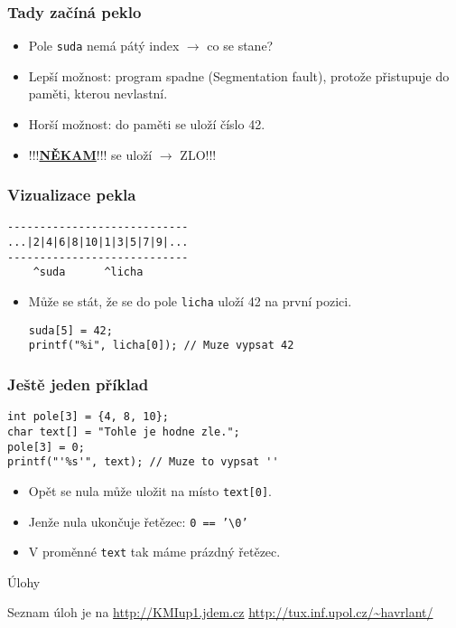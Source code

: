 \documentclass{beamer}
\newenvironment{itemizex}%
  {\large \begin{itemize}%
    \setlength{\itemsep}{8pt}%
    \setlength{\parskip}{8pt}}%
  {\end{itemize}}
\begin{document}
\begin{frame}[t,fragile]\frametitle{Tady začíná peklo} 
    \begin{itemizex}
        \begin{verbatim} 
int suda[5] = {2, 4, 6, 8, 10};
int licha[5] = {1, 3, 5, 7, 9};
suda[5] = 42;
        \end{verbatim}
        \item Pole \texttt{suda} nemá pátý index $\longrightarrow$ co se stane?
        \item Lepší možnost: program spadne (Segmentation fault), protože přistupuje do paměti, kterou nevlastní. 
        \item Horší možnost:  do paměti se uloží číslo 42.
        \item !!!\underline{\textbf{NĚKAM}}!!! se uloží $\longrightarrow$ ZLO!!!
    \end{itemizex}
\end{frame}


\begin{frame}[t,fragile]\frametitle{Vizualizace pekla} 
\begin{verbatim} 
----------------------------
...|2|4|6|8|10|1|3|5|7|9|...
----------------------------
    ^suda      ^licha
\end{verbatim}
    \begin{itemizex}
        \item Může se stát, že se do pole \texttt{licha} uloží 42 na první pozici.
        \begin{verbatim} 
suda[5] = 42;
printf("%i", licha[0]); // Muze vypsat 42
        \end{verbatim}
    \end{itemizex}
\end{frame}


\begin{frame}[t,fragile]\frametitle{Ještě jeden příklad}
\begin{verbatim} 
int pole[3] = {4, 8, 10};
char text[] = "Tohle je hodne zle.";
pole[3] = 0;
printf("'%s'", text); // Muze to vypsat ''
\end{verbatim}
    \begin{itemizex}
        \item Opět se nula může uložit na místo \texttt{text[0]}.
        \item Jenže nula ukončuje řetězec: \texttt{0 == '\textbackslash0'}
        \item V proměnné \texttt{text} tak máme prázdný řetězec.
    \end{itemizex}
\end{frame}


\begin{frame}[t,fragile]{Úlohy}
\begin{center}
\vskip 1cm
{\Large Seznam úloh je na \url{http://KMIup1.jdem.cz}}
\vskip 2cm
\url{http://tux.inf.upol.cz/~havrlant/}
\end{center}
\end{frame}
\end{document}
